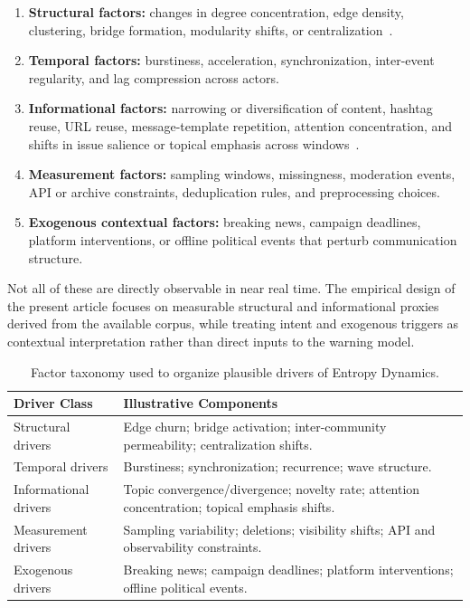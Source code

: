 \documentclass[sigconf]{acmart}
\begin{document}
\begin{enumerate}
    \item \textbf{Structural factors:} changes in degree concentration, edge density, clustering, bridge formation, modularity shifts, or centralization~\cite{YamakawaTajima2023}.
    \item \textbf{Temporal factors:} burstiness, acceleration, synchronization, inter-event regularity, and lag compression across actors.
    \item \textbf{Informational factors:} narrowing or diversification of content, hashtag reuse, URL reuse, message-template repetition, attention concentration, and shifts in issue salience or topical emphasis across windows~\cite{mccombs1972}.
    \item \textbf{Measurement factors:} sampling windows, missingness, moderation events, API or archive constraints, deduplication rules, and preprocessing choices.
    \item \textbf{Exogenous contextual factors:} breaking news, campaign deadlines, platform interventions, or offline political events that perturb communication structure.
\end{enumerate}

Not all of these are directly observable in near real time. The empirical design of the present article focuses on measurable structural and informational proxies derived from the available corpus, while treating intent and exogenous triggers as contextual interpretation rather than direct inputs to the warning model.

\begin{table}[t]
\caption{Factor taxonomy used to organize plausible drivers of Entropy Dynamics.}
\label{tab:taxonomy}
\centering
\scriptsize
\setlength{\tabcolsep}{3pt}
\renewcommand{\arraystretch}{1.05}
\begin{tabular}{p{} p{}}
\toprule
\textbf{Driver Class} & \textbf{Illustrative Components} \\
\midrule
Structural drivers &
Edge churn; bridge activation; inter-community permeability; centralization shifts. \\
Temporal drivers &
Burstiness; synchronization; recurrence; wave structure. \\
Informational drivers &
Topic convergence/divergence; novelty rate; attention concentration; topical emphasis shifts. \\
Measurement drivers &
Sampling variability; deletions; visibility shifts; API and observability constraints. \\
Exogenous drivers &
Breaking news; campaign deadlines; platform interventions; offline political events. \\
\bottomrule
\end{tabular}
\end{table}
\end{document}
